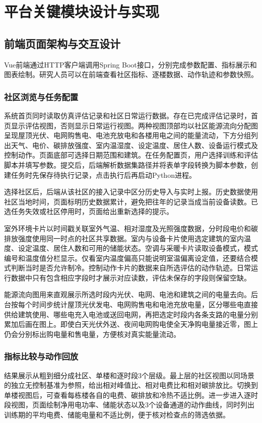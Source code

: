 \chapter{平台关键模块设计与实现}\label{chap:4}

\section{前端页面架构与交互设计}
Vue前端通过HTTP客户端调用Spring Boot接口，分别完成参数配置、指标展示和图表绘制。研究人员可以在前端查看社区指标、逐楼数据、动作轨迹和参数快照。

\subsection{社区浏览与任务配置}
系统首页同时读取仿真评估记录和社区日常运行数据。存在已完成评估记录时，首页显示评估视图，否则显示日常运行视图。两种视图顶部均以社区能源流向分配图呈现屋顶光伏、电网购售电、电池充放电和各楼用电之间的能量流动，下方分组列出天气、电价、碳排放强度、室内温湿度、设定温度、居住人数、设备运行模式及控制动作。页面底部可选择日期范围和建筑。在任务配置页，用户选择训练和评估脚本并填写参数。提交后，后端解析数据集路径并将表单字段转换为脚本参数，创建任务时先保存待执行记录，点击执行后再启动Python进程。

选择社区后，后端从该社区的接入记录中区分历史导入与实时上报。历史数据使用社区当地时间，页面标明历史数据累计，避免把往年的记录当成当前设备读数。已选任务失效或社区停用时，页面给出重新选择的提示。

室外环境卡片以时间戳关联室外气温、相对湿度及光照强度数据，分时段电价和碳排放强度使用同一时点的社区共享数据。室内与设备卡片使用选定建筑的室内温度、设定温度、居住人数和可用的储能状态。空调与采暖卡片读取设备模式，模式编号和温度值分栏显示。仅看室内温度偏高只能说明室温偏离设定值，还要结合模式判断当时是否允许制冷。控制动作卡片的数据来自所选评估的动作轨迹。日常运行数据中只有包含相应字段时才展示对应读数，评估未保存的字段则保留空缺。

能源流向图用来直观展示所选时段内光伏、电网、电池和建筑之间的电量去向。后台按每个时间步统计屋顶光伏发电、电网购售电和电池充放电量，区分哪些电直接供给建筑使用、哪些电充入电池或送回电网，再把选定时段内各条支路的电量分别累加后画在图上。即使白天光伏外送、夜间电网购电使全天净购电量接近零，图上仍会分别标出购电量和售电量，方便核对真实能量流动。

\subsection{指标比较与动作回放}
结果展示从粗到细分成社区、单楼和逐时段3个层级。最上层的社区视图以同场景的独立无控制基准为参照，给出相对峰值比、相对电费比和相对碳排放比。切换到单楼视图后，可查看每栋楼各自的电费、碳排放和冷热不适比例。进一步进入逐时段视图，页面绘制净用电功率、储能状态以及3个设备通道的动作曲线，同时列出训练期的平均电费、储能电量和不适比例，便于核对检查点的筛选依据。

